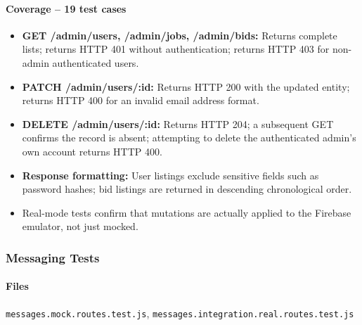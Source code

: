 \documentclass[11pt]{article}
\begin{document}
\paragraph{Coverage -- 19 test cases}
\begin{itemize}[leftmargin=1.4em]
  \item \textbf{GET /admin/users, /admin/jobs, /admin/bids:} Returns complete lists; returns HTTP 401 without authentication; returns HTTP 403 for non-admin authenticated users.
  \item \textbf{PATCH /admin/users/:id:} Returns HTTP 200 with the updated entity; returns HTTP 400 for an invalid email address format.
  \item \textbf{DELETE /admin/users/:id:} Returns HTTP 204; a subsequent GET confirms the record is absent; attempting to delete the authenticated admin's own account returns HTTP 400.
  \item \textbf{Response formatting:} User listings exclude sensitive fields such as password hashes; bid listings are returned in descending chronological order.
  \item Real-mode tests confirm that mutations are actually applied to the Firebase emulator, not just mocked.
\end{itemize}

\subsubsection{Messaging Tests}

\paragraph{Files}
\texttt{messages.mock.routes.test.js}, \texttt{messages.integration.real.routes.test.js}
\end{document}
